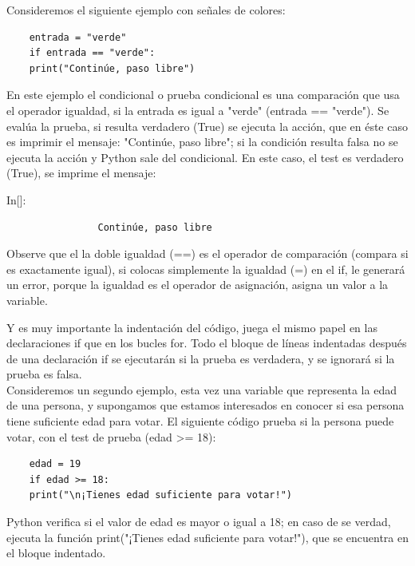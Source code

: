 Consideremos el siguiente ejemplo con señales de colores:

\hspace{-2.3cm}{\ttfamily \scriptsize colores.py}\vspace{-0.5cm}
\begin{lstlisting}
	entrada = "verde"
	if entrada == "verde":
	print("Continúe, paso libre") 
\end{lstlisting}


\noindent En este ejemplo el condicional o  prueba condicional es una comparación que usa el operador igualdad, si la entrada es igual a  "{}verde{}"{} ({\ttfamily entrada == {}"{}verde{}"{}}). Se evalúa la prueba, si resulta verdadero ({\ttfamily True})  se ejecuta la acción, que en éste caso es imprimir el mensaje: {}"{}Continúe, paso libre"; si la condición resulta falsa no se ejecuta la acción y Python sale del condicional.
\noindent En este caso, el test es verdadero ({\ttfamily True}), se imprime el mensaje:{\vspace{0.08cm}
	
	{\ttfamily\scriptsize\scriptsize \noindent In[]:\vspace{-0.3cm}	
		{\color{blue} 	
			\begin{verbatim}
				Continúe, paso libre
			\end{verbatim}
	}}
} 
Observe que el la doble igualdad ({\ttfamily ==}) es el operador de comparación (compara si es exactamente igual),  si colocas simplemente la igualdad ({\ttfamily =}) en el {\ttfamily if}, le generará un error, porque la igualdad  es el operador de asignación, asigna un valor a la variable.

Y es muy importante la indentación del código, juega el mismo papel en las declaraciones {\ttfamily if} que en los bucles {\ttfamily for}.
Todo  el bloque de líneas indentadas después de una declaración {\ttfamily if} se ejecutarán si la prueba es verdadera, y  se ignorará si la prueba es falsa.\\


Consideremos un segundo ejemplo, esta vez una variable que representa la edad de una persona, y supongamos que estamos interesados en conocer si esa persona tiene suficiente edad  para votar. El siguiente código prueba si
la persona puede votar, con el test de prueba ({\ttfamily edad >= 18}):

\hspace{-2.5cm}{\ttfamily \scriptsize votacion.py}\vspace{-0.5cm}
\begin{lstlisting}	
	edad = 19
	if edad >= 18:
	print("\n¡Tienes edad suficiente para votar!")
\end{lstlisting}Python verifica si el valor de edad es mayor o igual a 18; en caso de se verdad, ejecuta la función  {\ttfamily print({}"{}¡Tienes edad suficiente para votar!{}"{})}, que se encuentra en el bloque indentado.\\

